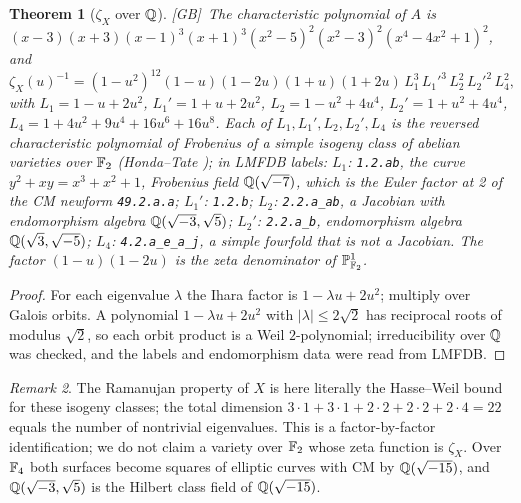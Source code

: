 \documentclass[11pt]{amsart}
\numberwithin{equation}{section}
\theoremstyle{plain}
\newtheorem{theorem}{Theorem}[section]
\theoremstyle{definition}\newtheorem{definition}[theorem]{Definition}
\theoremstyle{remark}\newtheorem{remark}[theorem]{Remark}
\newcommand{\ctag}[1]{\textup{\textsf{\scriptsize[#1]}}}
\begin{document}
\begin{theorem}[$\zeta_X$ over $\mathbb{Q}$]\label{thm:weil}
\ctag{GB}\ The characteristic polynomial of $A$ is $(x-3)(x+3)(x-1)^3(x+1)^3(x^2-5)^2(x^2-3)^2(x^4-4x^2+1)^2$, and
\[\zeta_X(u)^{-1}=(1-u^2)^{12}(1-u)(1-2u)(1+u)(1+2u)\,L_1^3\,L_1'^3\,L_2^2\,L_2'^2\,L_4^2,\]
with $L_1=1-u+2u^2$, $L_1'=1+u+2u^2$, $L_2=1-u^2+4u^4$, $L_2'=1+u^2+4u^4$, $L_4=1+4u^2+9u^4+16u^6+16u^8$. Each of $L_1,L_1',L_2,L_2',L_4$ is the reversed characteristic polynomial of Frobenius of a simple isogeny class of abelian varieties over $\mathbb{F}_2$ (Honda--Tate \cite{tate66,honda68}); in LMFDB \cite{lmfdb} labels: $L_1$: \texttt{1.2.ab}, the curve $y^2+xy=x^3+x^2+1$, Frobenius field $\mathbb{Q}(\sqrt{-7})$, which is the Euler factor at 2 of the CM newform \texttt{49.2.a.a}; $L_1'$: \texttt{1.2.b}; $L_2$: \texttt{2.2.a\_ab}, a Jacobian with endomorphism algebra $\mathbb{Q}(\sqrt{-3},\sqrt5)$; $L_2'$: \texttt{2.2.a\_b}, endomorphism algebra $\mathbb{Q}(\sqrt3,\sqrt{-5})$; $L_4$: \texttt{4.2.a\_e\_a\_j}, a simple fourfold that is not a Jacobian. The factor $(1-u)(1-2u)$ is the zeta denominator of $\mathbb P^1_{\mathbb{F}_2}$.
\end{theorem}
\begin{proof}
For each eigenvalue $\lambda$ the Ihara factor is $1-\lambda u+2u^2$; multiply over Galois orbits. A polynomial $1-\lambda u+2u^2$ with $|\lambda|\le2\sqrt2$ has reciprocal roots of modulus $\sqrt2$, so each orbit product is a Weil $2$-polynomial; irreducibility over $\mathbb{Q}$ was checked, and the labels and endomorphism data were read from LMFDB.
\end{proof}
\begin{remark}
The Ramanujan property of $X$ is here literally the Hasse--Weil bound for these isogeny classes; the total dimension $3\cdot1+3\cdot1+2\cdot2+2\cdot2+2\cdot4=22$ equals the number of nontrivial eigenvalues. This is a factor-by-factor identification; we do not claim a variety over $\mathbb{F}_2$ whose zeta function is $\zeta_X$. Over $\mathbb{F}_4$ both surfaces become squares of elliptic curves with CM by $\mathbb{Q}(\sqrt{-15})$, and $\mathbb{Q}(\sqrt{-3},\sqrt5)$ is the Hilbert class field of $\mathbb{Q}(\sqrt{-15})$.
\end{remark}
\end{document}
